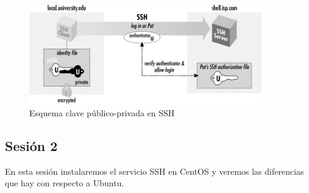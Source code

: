 \documentclass[12pt,spanish]{article}
\begin{document}
\begin{figure}[H]
	\centering
	\includegraphics[width=0.9\textwidth]{sshrsa.png}
	\caption{Esquema clave público-privada en SSH}
\end{figure}

\subsection{Sesión 2}

En esta sesión instalaremos el servicio SSH en CentOS y veremos las diferencias que hay con respecto a Ubuntu.
\end{document}
